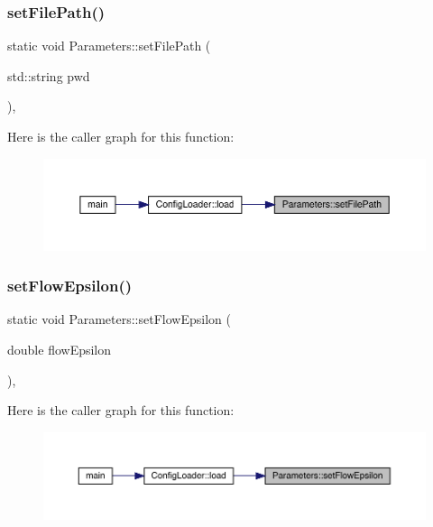\subsubsection{\texorpdfstring{setFilePath()}{setFilePath()}}
{\footnotesize\ttfamily static void Parameters\+::set\+File\+Path (\begin{DoxyParamCaption}\item[{std\+::string}]{pwd }\end{DoxyParamCaption})\hspace{0.3cm}{\ttfamily [inline]}, {\ttfamily [static]}}

Here is the caller graph for this function\+:\nopagebreak
\begin{figure}[H]
\begin{center}
\leavevmode
\includegraphics[width=350pt]{class_parameters_a5afe30ba482014c176433bb183a68976_icgraph}
\end{center}
\end{figure}
\mbox{\label{class_parameters_a9114804031d3c9342f590ce223a8b5a7}} 
\subsubsection{\texorpdfstring{setFlowEpsilon()}{setFlowEpsilon()}}
{\footnotesize\ttfamily static void Parameters\+::set\+Flow\+Epsilon (\begin{DoxyParamCaption}\item[{double}]{flow\+Epsilon }\end{DoxyParamCaption})\hspace{0.3cm}{\ttfamily [inline]}, {\ttfamily [static]}}

Here is the caller graph for this function\+:\nopagebreak
\begin{figure}[H]
\begin{center}
\leavevmode
\includegraphics[width=350pt]{class_parameters_a9114804031d3c9342f590ce223a8b5a7_icgraph}
\end{center}
\end{figure}
\mbox{\label{class_parameters_ad7a6cb2ff449a75c13df52c786da7b98}} 
